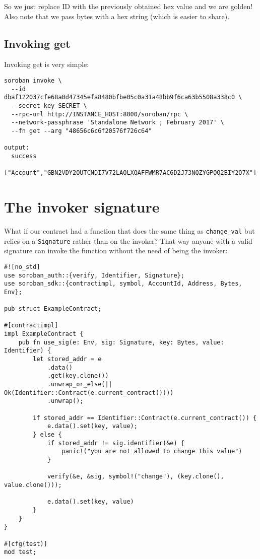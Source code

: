 So we just replace ID with the previously obtained hex value and we are golden! Also note that we pass bytes with a hex string (which is easier to share).

\subsection{Invoking get}\label{invoking-get}

Invoking get is very simple:

\begin{lstlisting}
soroban invoke \                                        
  --id dbaf122037cfe68a0d47345efa8480bfbe05c0a31a48bb9f6ca63b5508a338c0 \
  --secret-key SECRET \
  --rpc-url http://INSTANCE_HOST:8000/soroban/rpc \
  --network-passphrase 'Standalone Network ; February 2017' \
  --fn get --arg "48656c6c6f20576f726c64"   

output:
  success
  ["Account","GBN2VDY2OUTCNDI7V72LAQLXQAFFWMR7AC6D2J73NQZYGPQQ2BIY2O7X"]
\end{lstlisting}

\section{The invoker signature}\label{the-invoker-signature}

What if our contract had a function that does the same thing as \texttt{change\_val} but relies on a \texttt{Signature} rather than on the invoker? That way anyone with a valid signature can invoke the function without the need of being the invoker:

\begin{lstlisting}
#![no_std]
use soroban_auth::{verify, Identifier, Signature};
use soroban_sdk::{contractimpl, symbol, AccountId, Address, Bytes, Env};

pub struct ExampleContract;

#[contractimpl]
impl ExampleContract {
    pub fn use_sig(e: Env, sig: Signature, key: Bytes, value: Identifier) {
        let stored_addr = e
            .data()
            .get(key.clone())
            .unwrap_or_else(|| Ok(Identifier::Contract(e.current_contract())))
            .unwrap();

        if stored_addr == Identifier::Contract(e.current_contract()) {
            e.data().set(key, value);
        } else {
            if stored_addr != sig.identifier(&e) {
                panic!("you are not allowed to change this value")
            }

            verify(&e, &sig, symbol!("change"), (key.clone(), value.clone()));

            e.data().set(key, value)
        }
    }
}

#[cfg(test)]
mod test;

\end{lstlisting}


